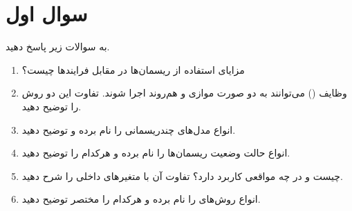 \section{سوال اول}

به سوالات زیر پاسخ دهید.

\begin{enumerate}
	\item 
	مزایای استفاده از ریسمان‌ها در مقابل فرایندها چیست؟
	\begin{qsolve}
		
	\end{qsolve}
	
	
	
	\item 
	وظایف () می‌توانند به دو صورت موازی و هم‌روند اجرا شوند. تفاوت این دو روش را توضیح دهید.

	\begin{qsolve}
		
	\end{qsolve}
	
	\item 
		انواع مدل‌های چندریسمانی را نام برده و توضیح دهید.
		
		\begin{qsolve}
			
		\end{qsolve}
		
	\item 
	انواع حالت وضعیت ریسمان‌ها را نام برده و هرکدام را توضیح دهید.
	
	\begin{qsolve}
		
	\end{qsolve}
	
	\item 
	  چیست و در چه مواقعی کاربرد دارد؟ تفاوت آن با متغیرهای داخلی را شرح دهید.
	
	\begin{qsolve}
		
	\end{qsolve}
	
	\item 
	انواع روش‌های  را نام برده و هرکدام را مختصر توضیح دهید.
	\begin{qsolve}
		
	\end{qsolve}
	
\end{enumerate}